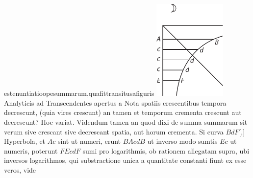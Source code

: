 \hfill
est\hfill enuntiatio\hfill ope\hfill summarum,\hfill qua\hfill fit\hfill transitus\hfill a\hfill figuris 
\pend
\vspace{1em}
\pstart
\noindent
\centering
\includegraphics[trim = 0mm -3mm 0mm 0mm, clip, width=0.27\textwidth]{images/lh03705_011v-d4.pdf}\\
\pend
\newpage
\pstart \noindent
Analyticis ad Transcendentes apertus
a 
Nota spatiis crescentibus tempora decrescunt, (quia vires crescunt)
an tamen et temporum crementa crescunt aut decrescunt?
Hoc variat.
\pend
\count{}
\count{}
\count{}
\pstart
    Videndum tamen an quod dixi de summa summarum sit verum sive crescant sive decrescant spatia, 
aut horum crementa.
Si curva $\displaystyle BdF$[,]   
Hyperbola, et $\displaystyle Ac$ sint ut numeri, erunt $\displaystyle BAcdB$ ut
inverso modo 
sumtis $\displaystyle Ec$ ut numeris, poterunt $\displaystyle FEcdF$ sumi pro logarithmis,
ob rationem allegatam 
   supra, ubi inversos logarithmos, qui substractione unica a quantitate constanti fiunt ex
esse veros, vide %
